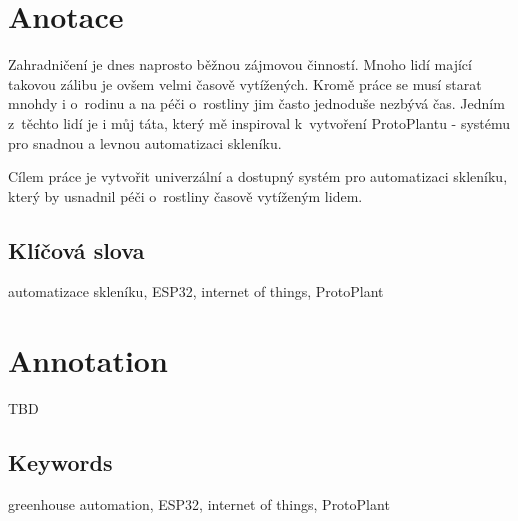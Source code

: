 \documentclass{template/socthesis}
\author{Petr Štourač}
\begin{document}
\maketitle



\pagestyle{empty}

\section*{Anotace}
Zahradničení je dnes naprosto běžnou zájmovou činností. Mnoho lidí mající takovou zálibu je ovšem velmi časově vytížených. Kromě práce se musí starat mnohdy i o~rodinu a na péči o~rostliny jim často jednoduše nezbývá čas. Jedním z~těchto lidí je i můj táta, který mě inspiroval k~vytvoření ProtoPlantu - systému pro snadnou a levnou automatizaci skleníku. 

Cílem práce je vytvořit univerzální a dostupný systém pro automatizaci skleníku, který by usnadnil péči o~rostliny časově vytíženým lidem. 

\subsection*{Klíčová slova}
automatizace skleníku, ESP32, internet of things, ProtoPlant 

\vspace{20mm}

\section*{Annotation}
TBD

\subsection*{Keywords}
greenhouse automation, ESP32, internet of things, ProtoPlant

\newpage
\pagestyle{plain}

\tableofcontents %

\setcounter{figure}{0}
\setcounter{table}{0}
\newpage




\end{document}
